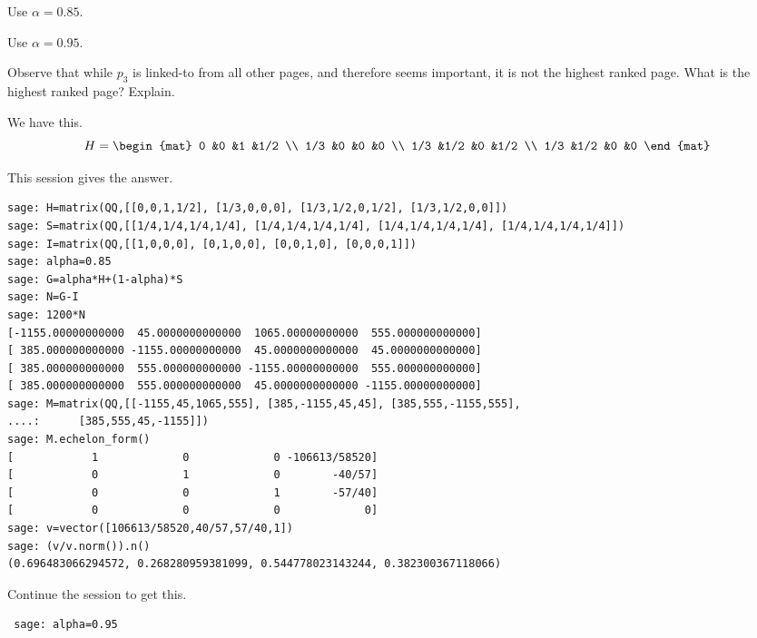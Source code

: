 \begin{exercises}
\begin{exparts}
      \item Use $\alpha=0.85$.
      \item Use $\alpha=0.95$.
      \item Observe that while $p_3$ is linked-to from all other pages,
        and therefore seems important, it is not the highest ranked page.
        What is the highest ranked page?
        Explain.
    \end{exparts}
    \begin{answer}
      We have this.
      \begin{equation*}
          H=\begin{mat}
               0     &0    &1    &1/2   \\
               1/3   &0    &0    &0   \\
               1/3   &1/2  &0    &1/2 \\
               1/3   &1/2  &0    &0
          \end{mat}
      \end{equation*}
      \begin{exparts}
        \item This \Sage{} session gives the answer.
\begin{lstlisting}
sage: H=matrix(QQ,[[0,0,1,1/2], [1/3,0,0,0], [1/3,1/2,0,1/2], [1/3,1/2,0,0]])
sage: S=matrix(QQ,[[1/4,1/4,1/4,1/4], [1/4,1/4,1/4,1/4], [1/4,1/4,1/4,1/4], [1/4,1/4,1/4,1/4]])
sage: I=matrix(QQ,[[1,0,0,0], [0,1,0,0], [0,0,1,0], [0,0,0,1]])
sage: alpha=0.85
sage: G=alpha*H+(1-alpha)*S
sage: N=G-I
sage: 1200*N
[-1155.00000000000  45.0000000000000  1065.00000000000  555.000000000000]
[ 385.000000000000 -1155.00000000000  45.0000000000000  45.0000000000000]
[ 385.000000000000  555.000000000000 -1155.00000000000  555.000000000000]
[ 385.000000000000  555.000000000000  45.0000000000000 -1155.00000000000]
sage: M=matrix(QQ,[[-1155,45,1065,555], [385,-1155,45,45], [385,555,-1155,555],
....:      [385,555,45,-1155]])
sage: M.echelon_form()
[            1             0             0 -106613/58520]
[            0             1             0        -40/57]
[            0             0             1        -57/40]
[            0             0             0             0]
sage: v=vector([106613/58520,40/57,57/40,1])
sage: (v/v.norm()).n()
(0.696483066294572, 0.268280959381099, 0.544778023143244, 0.382300367118066)
\end{lstlisting}
        \item Continue the \Sage{} session to get this.
\begin{lstlisting}
 sage: alpha=0.95

\end{lstlisting}
\end{exparts}
\end{answer}
\end{exercises}
